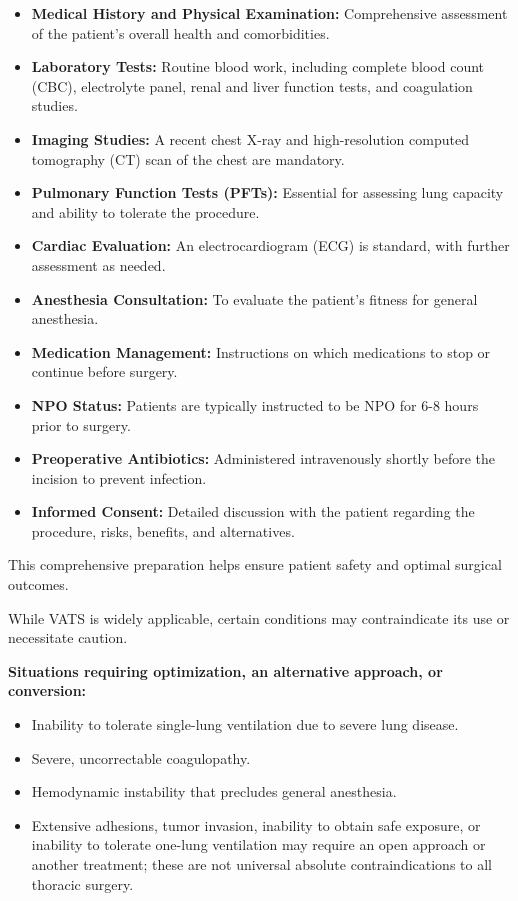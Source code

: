 \begin{itemize}
  \item \textbf{Medical History and Physical Examination:} Comprehensive assessment of the patient's overall health and comorbidities.
  \item \textbf{Laboratory Tests:} Routine blood work, including complete blood count (CBC), electrolyte panel, renal and liver function tests, and coagulation studies.
  \item \textbf{Imaging Studies:} A recent chest X-ray and high-resolution computed tomography (CT) scan of the chest are mandatory.
  \item \textbf{Pulmonary Function Tests (PFTs):} Essential for assessing lung capacity and ability to tolerate the procedure.
  \item \textbf{Cardiac Evaluation:} An electrocardiogram (ECG) is standard, with further assessment as needed.
  \item \textbf{Anesthesia Consultation:} To evaluate the patient's fitness for general anesthesia.
  \item \textbf{Medication Management:} Instructions on which medications to stop or continue before surgery.
  \item \textbf{NPO Status:} Patients are typically instructed to be NPO for 6-8 hours prior to surgery.
  \item \textbf{Preoperative Antibiotics:} Administered intravenously shortly before the incision to prevent infection.
  \item \textbf{Informed Consent:} Detailed discussion with the patient regarding the procedure, risks, benefits, and alternatives.
\end{itemize}

This comprehensive preparation helps ensure patient safety and optimal surgical outcomes.

While VATS is widely applicable, certain conditions may contraindicate its use or necessitate caution.

\textbf{Situations requiring optimization, an alternative approach, or conversion:}
\begin{itemize}
  \item Inability to tolerate single-lung ventilation due to severe lung disease.
  \item Severe, uncorrectable coagulopathy.
  \item Hemodynamic instability that precludes general anesthesia.
  \item Extensive adhesions, tumor invasion, inability to obtain safe exposure, or inability to tolerate one-lung ventilation may require an open approach or another treatment; these are not universal absolute contraindications to all thoracic surgery.
\end{itemize}

